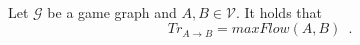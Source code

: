 {}
\begin{theorem} \ \\
  \label{trustflow}
  Let $\mathcal{G}$ be a game graph and $A, B \in \mathcal{V}$. It holds that
  \begin{equation*}
    Tr_{A \rightarrow B} = maxFlow\left(A, B\right) \enspace.
  \end{equation*}
\end{theorem}
